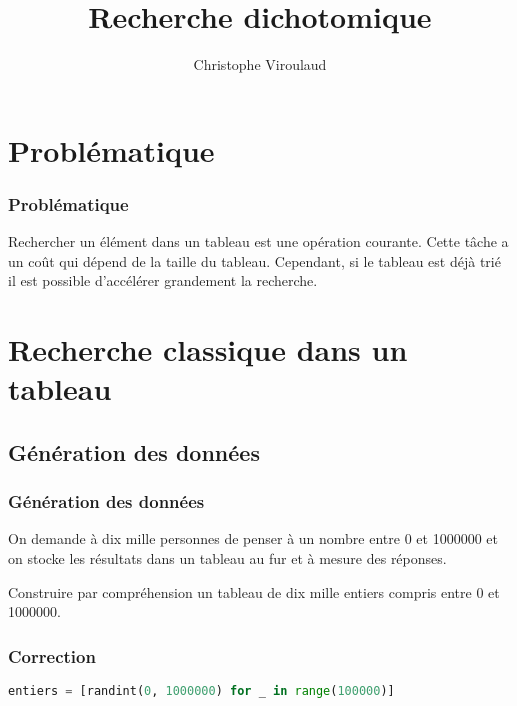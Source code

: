 \documentclass[svgnames,11pt]{beamer}
\author[]{Christophe Viroulaud}
\title{Recherche dichotomique}
\date{}
\institute{Première - NSI}
\begin{document}
\begin{frame}
\titlepage
\end{frame}

\section{Problématique}
\begin{frame}
    \frametitle{Problématique}
    Rechercher un élément dans un tableau est une opération courante. Cette tâche a un coût qui dépend de la taille du tableau.
    Cependant, si le tableau est déjà trié il est possible d'accélérer grandement la recherche.
    \begin{center}
    \end{center}
    

\end{frame}

\section{Recherche classique dans un tableau}
\subsection{Génération des données}
\begin{frame}
    \frametitle{Génération des données}

    On demande à dix mille personnes de penser à un nombre entre 0 et 1000000 et on stocke les résultats dans un tableau au fur et à mesure des réponses.
\begin{activite}
    Construire par compréhension un tableau de dix mille entiers compris entre 0 et 1000000.
\end{activite}

\end{frame}
\begin{frame}[fragile]
    \frametitle{Correction}

    \begin{center}
    \begin{lstlisting}[language=Python , basicstyle=\small, xleftmargin=2em, xrightmargin=2em]
entiers = [randint(0, 1000000) for _ in range(100000)]
\end{lstlisting}
    \label{CODE}
    \end{center}

\end{frame}
\end{document}
